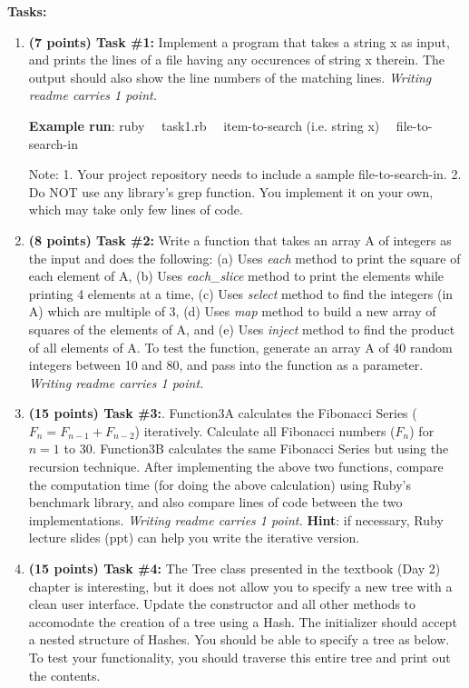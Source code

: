 \documentclass[paper=letter, fontsize=11pt]{scrartcl} %
\begin{document}
    \textbf{Tasks:}
    \begin{enumerate}[noitemsep]
        \item \textbf{(7 points) Task \#1:} 
Implement a program that takes a string x as input, 
and prints the lines of a file having any 
occurences of string x therein. 
The output should also show the line numbers of the matching lines.
\emph{Writing readme carries 1 point.}

\textbf{Example run}: ruby $~~~$  task1.rb $~~~$  item-to-search (i.e. string x)  $~~~$ file-to-search-in 

Note: 1. Your project repository needs to include a sample file-to-search-in. 2. Do NOT use any library's grep function. You implement it on your own, which may take only few lines of code.
      
  \item \textbf{(8 points) Task \#2:} Write a function that takes an array A of integers as the input and does the following: 
(a) Uses \emph{each} method to print the square of each element of A, (b) Uses \emph{each\_slice} method to print the elements while printing 
4 elements at a time, (c) Uses \emph{select} method to find the integers (in A) which are multiple of 3, (d) Uses \emph{map} method to build a 
new array of squares of the elements of A, and (e) Uses \emph{inject} method to find the product of all elements of A.
To test the function, generate an array A of 40 random integers between 10 and 80, and pass into the function as a parameter.
\emph{Writing readme carries 1 point.}
        \item \textbf{(15 points) Task \#3:}. Function3A calculates the Fibonacci Series ($F_n = F_{n-1} + F_{n-2}$) iteratively. 
Calculate all Fibonacci numbers ($F_n$) for $n=1$ to 30. 
Function3B calculates the same Fibonacci Series but using the recursion technique. 
After implementing the above two functions, compare the computation time (for doing the above calculation) 
using Ruby's benchmark library, and also compare lines of code between the two implementations. 
\emph{Writing readme carries 1 point.}
\textbf{Hint}: if necessary, Ruby lecture slides (ppt) can help you write the iterative version.
        \item \textbf{(15 points) Task \#4:} The Tree class presented in the textbook (Day 2) chapter is interesting, but it does not allow 
you to specify a new tree with a clean user interface. Update the constructor and all other methods to accomodate the creation of a tree using a Hash. 
The initializer should accept a nested structure of Hashes. You should be able to specify a tree as below. To test your functionality, you should traverse 
this entire tree and print out the contents.


\end{enumerate}
\end{document}
